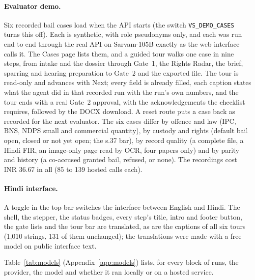 \paragraph{Evaluator demo.} Six recorded bail cases load when the API starts (the switch \texttt{VS\_DEMO\_CASES} turns this off). Each is synthetic, with role pseudonyms only, and each was run end to end through the real API on Sarvam-105B exactly as the web interface calls it. The Cases page lists them, and a guided tour walks one case in nine steps, from intake and the dossier through Gate~1, the Rights Radar, the brief, sparring and hearing preparation to Gate~2 and the exported file. The tour is read-only and advances with Next; every field is already filled, each caption states what the agent did in that recorded run with the run's own numbers, and the tour ends with a real Gate~2 approval, with the acknowledgements the checklist requires, followed by the DOCX download. A reset route puts a case back as recorded for the next evaluator. The six cases differ by offence and law (IPC, BNS, NDPS small and commercial quantity), by custody and rights (default bail open, closed or not yet open; the s.37 bar), by record quality (a complete file, a Hindi FIR, an image-only page read by OCR, four papers only) and by parity and history (a co-accused granted bail, refused, or none). The recordings cost INR 36.67 in all (85 to 139 hosted calls each).

\paragraph{Hindi interface.} A toggle in the top bar switches the interface between English and Hindi. The shell, the stepper, the status badges, every step's title, intro and footer button, the gate lists and the tour bar are translated, as are the captions of all six tours (1{,}010 strings, 131 of them unchanged); the translations were made with a free model on public interface text.

Table~\ref{tab:models} (Appendix~\ref{app:models}) lists, for every block of runs, the provider, the model and whether it ran locally or on a hosted service.
